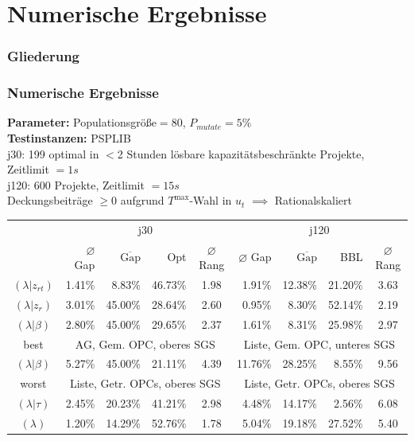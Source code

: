 
\section{Numerische Ergebnisse}
\begin{frame}
\frametitle{Gliederung}
\end{frame}


\begin{frame}[t]
\frametitle{Numerische Ergebnisse}
\begin{footnotesize}
\textbf{Parameter:} Populationsgröße$=80$, $P_{mutate}=5\%$\\
\textbf{Testinstanzen:} PSPLIB\\
j30: 199 optimal in $<$2 Stunden lösbare kapazitätsbeschränkte Projekte, Zeitlimit $=1s$\\
j120: 600 Projekte, Zeitlimit $=15s$\\[3mm]
Deckungsbeiträge $\geq 0$ aufgrund $T^{\mbox{max}}$-Wahl in $u_t$ $\implies$ Rationalskaliert

\begin{center}	
\tabcolsep=0.16cm
\begin{tabular}{|c|rrrc|rrrc|}
	\hline
	& \multicolumn{4}{c|}{j30} & \multicolumn{4}{c|}{j120}\\
	 & $\varnothing$ Gap & $\overline{\mbox{Gap}}$ & Opt & $\varnothing$ Rang & $\varnothing$ Gap & $\overline{\mbox{Gap}}$ & BBL & $\varnothing$ Rang \\[3pt]
	\hline
   $(\lambda|z_{rt})$&1.41\%&8.83\%&46.73\%&1.98&1.91\%&12.38\%&21.20\%&3.63\\
	\hline
   $(\lambda|z_r)$&3.01\%&45.00\%&28.64\%&2.60&0.95\%&8.30\%&52.14\%&2.19\\
	\hline
	$(\lambda|\beta)$&2.80\%&45.00\%&29.65\%&2.37&1.61\%&8.31\%&25.98\%&2.97\\
	best & \multicolumn{4}{c|}{AG, Gem. OPC, oberes SGS} & \multicolumn{4}{c|}{Liste, Gem. OPC, unteres SGS}\\
	\hline
	$(\lambda|\beta)$&5.27\%&45.00\%&21.11\%&4.39&11.76\%&28.25\%&8.55\%&9.56\\
	worst & \multicolumn{4}{c|}{Liste, Getr. OPCs, oberes SGS} & \multicolumn{4}{c|}{Liste, Getr. OPCs, oberes SGS}\\
	\hline
	$(\lambda|\tau)$&2.45\%&20.23\%&41.21\%&2.98&4.48\%&14.17\%&2.56\%&6.08\\
	\hline
	$(\lambda)$&1.20\%&14.29\%&52.76\%&1.78&5.04\%&19.18\%&27.52\%&5.40\\
	\hline
\end{tabular}
\end{center}

\end{footnotesize}	

\end{frame}

